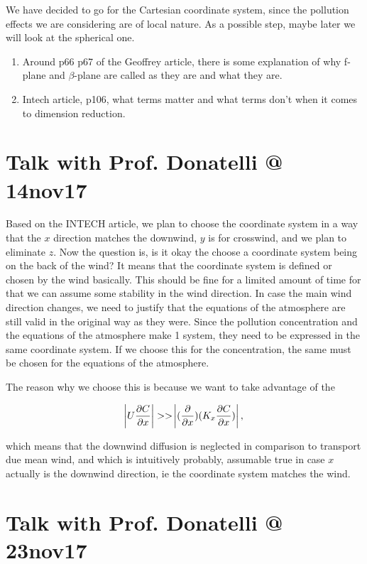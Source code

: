 \documentclass{article}
\begin{document}
We have decided to go for the Cartesian coordinate system, since the pollution effects we are considering are of local nature. As a possible step, maybe later we will look at the spherical one.

\begin{enumerate}
\item Around p66 p67 of the Geoffrey article, there is some explanation of why f-plane and $\beta$-plane are called as they are and what they are.
\item Intech article, p106, what terms matter and what terms don't when it comes to dimension reduction.
\end{enumerate}

\section{Talk with Prof. Donatelli @ 14nov17}

Based on the INTECH article, we plan to choose the coordinate system in a way that the $x$ direction matches the downwind, $y$ is for crosswind, and we plan to eliminate $z$. Now the question is, is it okay the choose a coordinate system being on the back of the wind? It means that the coordinate system is defined or chosen by the wind basically. This should be fine for a limited amount of time for that we can assume some stability in the wind direction. In case the main wind direction changes, we need to justify that the equations of the atmosphere are still valid in the original way as they were. Since the pollution concentration and the equations of the atmosphere make 1 system, they need to be expressed in the same coordinate system. If we choose this for the concentration, the same must be chosen for the equations of the atmosphere.

The reason why we choose this is because we want to take advantage of the

\[ \abs{U \frac{\partial C}{\partial x}} >> \abs{ (\frac{\partial}{\partial x}) (K_x \frac{\partial C}{\partial x}) },\]

which means that the downwind diffusion is neglected in comparison to transport due mean wind, and which is intuitively probably, assumable true in case $x$ actually is the downwind direction, ie the coordinate system matches the wind.

\section{Talk with Prof. Donatelli @ 23nov17}
\end{document}
